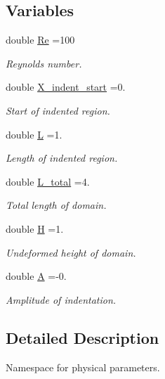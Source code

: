 \subsection*{Variables}
\begin{DoxyCompactItemize}
\item 
double \hyperlink{namespaceGlobal__Physical__Variables_ab814e627d2eb5bc50318879d19ab16b9}{Re} =100
\begin{DoxyCompactList}\small\item\em Reynolds number. \end{DoxyCompactList}\item 
double \hyperlink{namespaceGlobal__Physical__Variables_a84cf50616e15acc4db0d9d8765302128}{X\+\_\+indent\+\_\+start} =0.
\begin{DoxyCompactList}\small\item\em Start of indented region. \end{DoxyCompactList}\item 
double \hyperlink{namespaceGlobal__Physical__Variables_a1b8bfc451f6b7ac89eca18f04338f47f}{L} =1.
\begin{DoxyCompactList}\small\item\em Length of indented region. \end{DoxyCompactList}\item 
double \hyperlink{namespaceGlobal__Physical__Variables_a9ec945e33c27b1cfe2e4da7cf3a89f72}{L\+\_\+total} =4.
\begin{DoxyCompactList}\small\item\em Total length of domain. \end{DoxyCompactList}\item 
double \hyperlink{namespaceGlobal__Physical__Variables_af6e07423e22c0991084d9a2f43727805}{H} =1.
\begin{DoxyCompactList}\small\item\em Undeformed height of domain. \end{DoxyCompactList}\item 
double \hyperlink{namespaceGlobal__Physical__Variables_a4894f9a3a9cbf84f00d0719f2841e624}{A} =-\/0.
\begin{DoxyCompactList}\small\item\em Amplitude of indentation. \end{DoxyCompactList}\end{DoxyCompactItemize}


\subsection{Detailed Description}
Namespace for physical parameters. 

